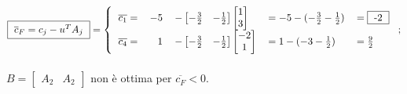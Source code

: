 \documentclass{article}
\begin{document}
\begin{preview}
                \paragraph{}
                \begin{math}
                        \framebox{ $ \overline{c}_F = c_j - u^{T}A_j $ } = \begin{dcases}
                                \begin{tabular}{r r l l l}
                                        $ \overline{c_1} = $ & $ -5 $ & $ - \begin{bmatrix}
                                                -\frac{3}{2} & -\frac{1}{2}
                                        \end{bmatrix} \begin{bmatrix}
                                                1 \\
                                                3
                                        \end{bmatrix} $ & $ = -5 - (-\frac{3}{2} - \frac{1}{2}) $ & $ = \framebox{ -2 } $ \\
                                        $ \overline{c_4} = $ & $ 1 $ & $ - \begin{bmatrix}
                                                -\frac{3}{2} & -\frac{1}{2}
                                        \end{bmatrix} \begin{bmatrix}
                                                -2 \\
                                                1
                                        \end{bmatrix} $ & $ = 1 - (-3 - \frac{1}{2}) $ & $ = \frac{9}{2} $
                                \end{tabular}
                        \end{dcases};
                \end{math}

                \paragraph{}
                \begin{math}
                        B = \begin{bmatrix}
                                A_2 & A_2
                        \end{bmatrix}
                \end{math} non \`{e} ottima per $ \overline{c_F} < 0 $.


\end{preview}
\end{document}
